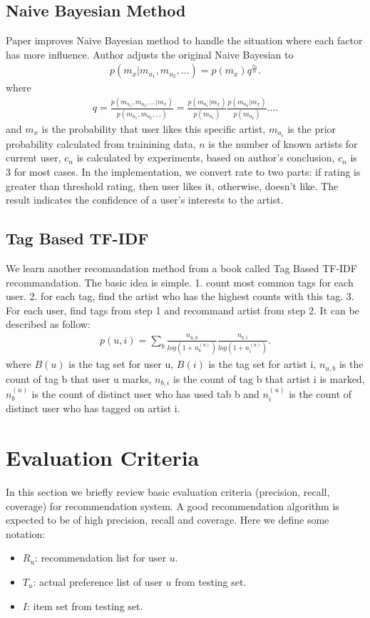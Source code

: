 \documentclass{sig-alternate}
\begin{document}
\subsection{Naive Bayesian Method}
Paper\cite{naivebayesian} improves Naive Bayesian method to handle the situation where each factor has more influence. Author adjusts the original Naive Bayesian to 
\begin{gather*}
p(m_x|m_{u_1},m_{u_2},...)=p(m_x)q^\frac{c_n}{n}.
\end{gather*}
where
\begin{gather*}
q=\frac{p(m_{u_1},m_{u_2},...|m_x)}{p(m_{u_1},m_{u_2},...)}=\frac{p(m_{u_1}|m_x)}{p(m_{u_1})} \frac{p(m_{u_2}|m_x)}{p(m_{u_2})} ....
\end{gather*}
and $m_x$ is the probability that user likes this specific artist, $m_{u_i}$ is the prior probability calculated from trainining data, $n$ is the number of known artists for current user, $c_n$ is calculated by experiments, based on author's conclusion, $c_n$ is 3 for most cases.  In the implementation, we convert rate to two parts: if rating is greater than threshold rating, then user likes it, otherwise,  doesn't like.  The result indicates the confidence of a user's interests to the artist.


\subsection{Tag Based TF-IDF}
We learn another recomandation method from a book called Tag Based TF-IDF recommandation.  The basic idea is simple.  1. count most common tags for each user. 2. for each tag, find the artist who has the highest counts with this tag.  3. For each user, find tags from step 1 and recommand artist from step 2.  It can be described as follow: 
\begin{gather*}
p(u,i)=\sum_{b} \frac{n_{u,b}}{log(1+n_b^{(u)})}\frac{n_{b,i}}{log(1+n_i^{(u)})}.
\end{gather*}
where $B(u)$ is the tag set for user u, $B(i)$ is the tag set for artist i, $n_{u,b}$  is the count of tag b that user u marks, $n_{b,i}$ is the count of tag b that artist i is marked, $n_b^{(u)}$ is the count of distinct user who has used tab b and $n_i^{(u)}$ is the count of distinct user who has tagged on artist i. 


\section{Evaluation Criteria}
In this section we briefly review basic evaluation criteria (precision, recall, coverage) for recommendation system. A good recommendation algorithm is expected to be of high precision,  recall and coverage. Here we define some notation:
\begin{itemize}
\item $R_u$: recommendation list for user $u$.
\item $T_u$: actual preference list of user $u$ from testing set.
\item $I$: item set from testing set.
\end{itemize}
\end{document}

